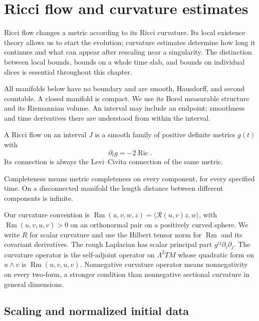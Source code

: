 \chapter{Ricci flow and curvature estimates}
\label{ch:ricci-flow-v4}

Ricci flow changes a metric according to its Ricci curvature.  Its local
existence theory allows us to start the evolution; curvature estimates
determine how long it continues and what can appear after rescaling near a
singularity.  The distinction between local bounds, bounds on a whole time
slab, and bounds on individual slices is essential throughout this chapter.

All manifolds below have no boundary and are smooth, Hausdorff, and second
countable.  A closed manifold is compact.  We use its Borel measurable
structure and its Riemannian volume.  An interval may include an endpoint;
smoothness and time derivatives there are understood from within the interval.
\begin{definition}\label{def:rf-flow}
A Ricci flow on an interval $J$ is a smooth family of positive definite
metrics $g(t)$ with
\begin{equation}\label{eq:rf-equation}
                         \partial_t g=-2\operatorname{Ric}.
\end{equation}
Its connection is always the Levi--Civita connection of the same metric.
\end{definition}
Completeness means metric completeness on every component, for every
specified time.  On a disconnected manifold the length distance between
different components is infinite.

Our curvature convention is
$\operatorname{Rm}(u,v,w,z)=\langle\mathcal R(u,v)z,w\rangle$,
with $\operatorname{Rm}(u,v,u,v)>0$ on an orthonormal pair on a positively
curved sphere.  We write $R$ for scalar curvature and use the Hilbert tensor
norm for $\operatorname{Rm}$ and its covariant derivatives.  The rough
Laplacian has scalar principal part $g^{ij}\partial_i\partial_j$.
The curvature operator is the self-adjoint operator on $\Lambda^2 TM$
whose quadratic form on $u\wedge v$ is
$\operatorname{Rm}(u,v,u,v)$.  Nonnegative curvature operator means
nonnegativity on every two-form, a stronger condition than nonnegative
sectional curvature in general dimensions.

\section{Scaling and normalized initial data}
\label{sec:rf-normalization}

